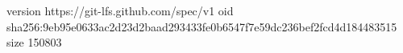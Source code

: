 version https://git-lfs.github.com/spec/v1
oid sha256:9eb95e0633ac2d23d2baad293433fe0b6547f7e59dc236bef2fcd4d184483515
size 150803
